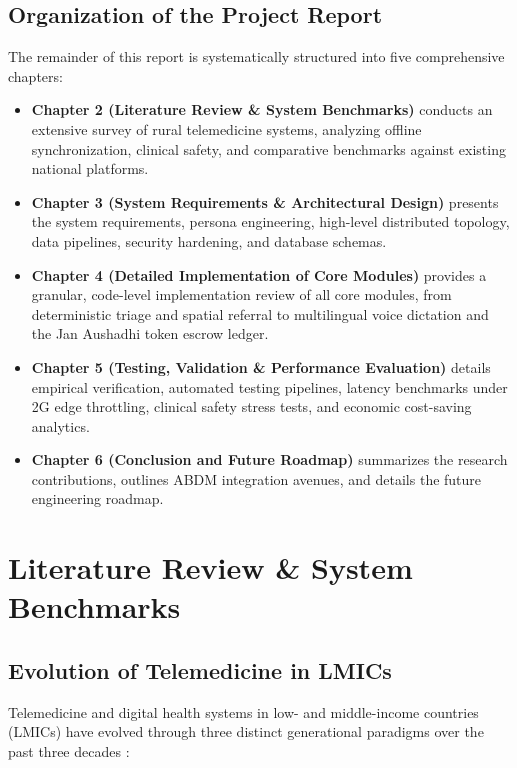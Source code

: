 \documentclass[12pt,a4paper,oneside]{report}
\begin{document}
\section{Organization of the Project Report}
The remainder of this report is systematically structured into five comprehensive chapters:
\begin{itemize}[leftmargin=1.5em,itemsep=1pt,topsep=1pt,parsep=0pt]
    \item \textbf{Chapter 2 (Literature Review \& System Benchmarks)} conducts an extensive survey of rural telemedicine systems, analyzing offline synchronization, clinical safety, and comparative benchmarks against existing national platforms.
    \item \textbf{Chapter 3 (System Requirements \& Architectural Design)} presents the system requirements, persona engineering, high-level distributed topology, data pipelines, security hardening, and database schemas.
    \item \textbf{Chapter 4 (Detailed Implementation of Core Modules)} provides a granular, code-level implementation review of all core modules, from deterministic triage and spatial referral to multilingual voice dictation and the Jan Aushadhi token escrow ledger.
    \item \textbf{Chapter 5 (Testing, Validation \& Performance Evaluation)} details empirical verification, automated testing pipelines, latency benchmarks under 2G edge throttling, clinical safety stress tests, and economic cost-saving analytics.
    \item \textbf{Chapter 6 (Conclusion and Future Roadmap)} summarizes the research contributions, outlines ABDM integration avenues, and details the future engineering roadmap.
\end{itemize}

\chapter{Literature Review \& System Benchmarks}

\section{Evolution of Telemedicine in LMICs}
Telemedicine and digital health systems in low- and middle-income countries (LMICs) have evolved through three distinct generational paradigms over the past three decades \cite{de2022}:
\end{document}
